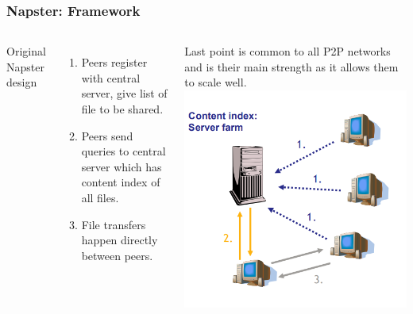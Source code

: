 \begin{frame}
    \frametitle{Napster: Framework}
    \begin{columns}
        Original Napster design
        \begin{enumerate}
            \item Peers register with central server, give list of file to be shared.
            \item Peers send queries to central server which has content index of all files.
            \item File transfers happen directly between peers.
        \end{enumerate}
        Last point is common to all P2P networks and is their main strength as it allows them to scale well.
            \includegraphics[scale=0.3]{figures/napster.png}
        \end{columns}
\end{frame}

